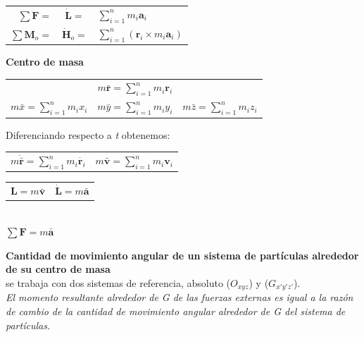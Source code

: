 \documentclass[11pt,a4paper,twocolumn]{article}
\newcommand{\vc}[1]{\textbf{#1}}
\begin{document}
	\begin{tcolorbox}
		\begin{center}
			\begin{tabular}{ r c l }
				$\sum \vc{F}= $&$\dot{\vc{L}}=$&$ \sum_{i=1}^{n}m_{i}\vc{a}_{i}$\\
				$\sum \vc{M}_{o}= $&$\dot{\vc{H}}_{o}=$&$ \sum_{i=1}^{n}(\vc{r}_{i}\times m_{i}\vc{a}_{i})$
			\end{tabular}
		\end{center}
	\end{tcolorbox}
	
	\textbf{Centro de masa}
	\vspace{-0.55cm}
	\begin{center}
		\begin{tabular}{ r c l }
			&$m\bar{\vc{r}}=\sum_{i=1}^{n} m_{i}\vc{r}_{i} $& \\
			$m\bar{x}=\sum_{i=1}^{n} m_{i}x_{i}$&$m\bar{y}=\sum_{i=1}^{n} m_{i}y_{i}$ &$m\bar{z}=\sum_{i=1}^{n} m_{i}z_{i}$ \\
		\end{tabular}
	\end{center}
	Diferenciando respecto a \textit{t} obtenemos:
	\begin{center}
		\begin{tabular}{ r l }
			$m\dot{\bar{\vc{r}}}=\sum_{i=1}^{n} m_{i}\dot{\vc{r}_{i}} $&$m\bar{\vc{v}}=\sum_{i=1}^{n} m_{i}\vc{v}_{i} $\\
		\end{tabular}
	\end{center}

	\begin{tcolorbox}
			\begin{center}
			\begin{tabular}{ r l }
				$\vc{L}=m\bar{\vc{v}} $&$\dot{\vc{L}}=m\bar{\vc{a}}$\\
			\end{tabular}\\
			$\sum\vc{F}=m\bar{\vc{a}}$
		\end{center}
	\end{tcolorbox}

	\textbf{Cantidad de movimiento angular de un sistema de partículas alrededor de su centro de masa}\\
	se trabaja con dos sistemas de referencia, absoluto ($O_{xyz}$) y ($G_{x'y'z'}$).\\
	 \textit{El momento resultante alrededor de G de las fuerzas externas es igual a la razón de cambio de la cantidad de movimiento angular alrededor de G del sistema de partículas.}\\
	
\end{document}

